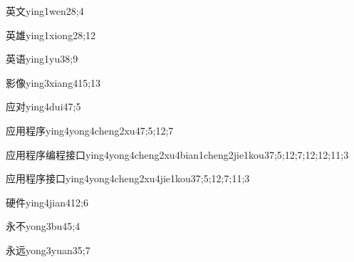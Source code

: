 \begin{verbete}{英文}{ying1wen2}{8;4}
\end{verbete}

\begin{verbete}{英雄}{ying1xiong2}{8;12}
\end{verbete}

\begin{verbete}{英语}{ying1yu3}{8;9}
\end{verbete}

\begin{verbete}{影像}{ying3xiang4}{15;13}
\end{verbete}

\begin{verbete}{应对}{ying4dui4}{7;5}
\end{verbete}

\begin{verbete}{应用程序}{ying4yong4cheng2xu4}{7;5;12;7}
\end{verbete}

\begin{verbete}{应用程序编程接口}{ying4yong4cheng2xu4bian1cheng2jie1kou3}{7;5;12;7;12;12;11;3}
\end{verbete}

\begin{verbete}{应用程序接口}{ying4yong4cheng2xu4jie1kou3}{7;5;12;7;11;3}
\end{verbete}

\begin{verbete}{硬件}{ying4jian4}{12;6}
\end{verbete}

\begin{verbete}{永不}{yong3bu4}{5;4}
\end{verbete}

\begin{verbete}{永远}{yong3yuan3}{5;7}
\end{verbete}

